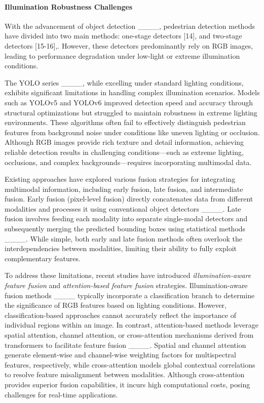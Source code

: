 \paragraph{Illumination Robustness Challenges}
With the advancement of object detection ____, pedestrian detection methods have divided into two main methods: one-stage detectors [14], and two-stage detectors [15-16],. However, these detectors predominantly rely on RGB images, leading to performance degradation under low-light or extreme illumination conditions.


The YOLO series ____, while excelling under standard lighting conditions, exhibits significant limitations in handling complex illumination scenarios. Models such as YOLOv5 and YOLOv6 improved detection speed and accuracy through structural optimizations but struggled to maintain robustness in extreme lighting environments. These algorithms often fail to effectively distinguish pedestrian features from background noise under conditions like uneven lighting or occlusion. Although RGB images provide rich texture and detail information, achieving reliable detection results in challenging conditions—such as extreme lighting, occlusions, and complex backgrounds—requires incorporating multimodal data.

Existing approaches have explored various fusion strategies for integrating multimodal information, including early fusion, late fusion, and intermediate fusion. Early fusion (pixel-level fusion) directly concatenates data from different modalities and processes it using conventional object detectors ____. Late fusion involves feeding each modality into separate single-modal detectors and subsequently merging the predicted bounding boxes using statistical methods ____. While simple, both early and late fusion methods often overlook the interdependencies between modalities, limiting their ability to fully exploit complementary features.

To address these limitations, recent studies have introduced \textit{illumination-aware feature fusion} and \textit{attention-based feature fusion} strategies. Illumination-aware fusion methods ____ typically incorporate a classification branch to determine the significance of RGB features based on lighting conditions. However, classification-based approaches cannot accurately reflect the importance of individual regions within an image. In contrast, attention-based methods leverage spatial attention, channel attention, or cross-attention mechanisms derived from transformers to facilitate feature fusion ____. Spatial and channel attention generate element-wise and channel-wise weighting factors for multispectral features, respectively, while cross-attention models global contextual correlations to resolve feature misalignment between modalities. Although cross-attention provides superior fusion capabilities, it incurs high computational costs, posing challenges for real-time applications.
